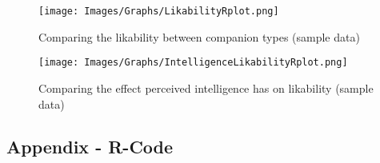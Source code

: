 \documentclass{IEEEtran}
\begin{document}
\label{AppendixGraphs}
\begin{figure}[h!]
  \centering
  \texttt{[image: Images/Graphs/LikabilityRplot.png]}
  
\caption{Comparing the likability between companion types (sample data)}
\label{fig:LikabilityRplot}
\end{figure}

\begin{figure}[h!]
  \centering
  \texttt{[image: Images/Graphs/IntelligenceLikabilityRplot.png]}
  
\caption{Comparing the effect perceived intelligence has on likability (sample data)}
\label{fig:IntelligenceLikabilityRplot}
\end{figure}

\onecolumn
\subsection{Appendix - R-Code}
\label{AppendixRCode}
\end{document}
